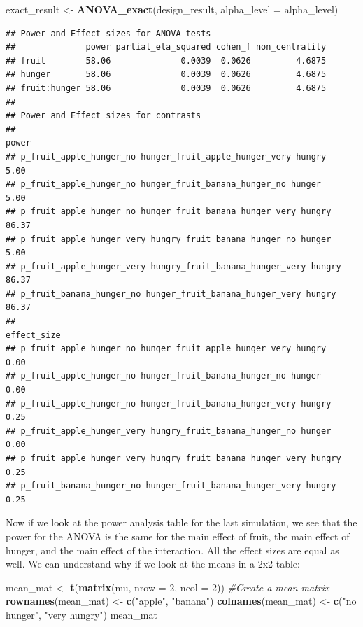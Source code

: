 \documentclass[]{book}
\newenvironment{Shaded}{\begin{snugshade}}{\end{snugshade}}
\newcommand{\CommentTok}[1]{\textcolor[rgb]{0.56,0.35,0.01}{\textit{#1}}}
\newcommand{\DataTypeTok}[1]{\textcolor[rgb]{0.13,0.29,0.53}{#1}}
\newcommand{\DecValTok}[1]{\textcolor[rgb]{0.00,0.00,0.81}{#1}}
\newcommand{\KeywordTok}[1]{\textcolor[rgb]{0.13,0.29,0.53}{\textbf{#1}}}
\newcommand{\NormalTok}[1]{#1}
\newcommand{\StringTok}[1]{\textcolor[rgb]{0.31,0.60,0.02}{#1}}
\begin{document}
\begin{Shaded}
\begin{Highlighting}[]
\NormalTok{exact_result <-}\StringTok{ }\KeywordTok{ANOVA_exact}\NormalTok{(design_result, }\DataTypeTok{alpha_level =}\NormalTok{ alpha_level)}
\end{Highlighting}
\end{Shaded}

\begin{verbatim}
## Power and Effect sizes for ANOVA tests
##              power partial_eta_squared cohen_f non_centrality
## fruit        58.06              0.0039  0.0626         4.6875
## hunger       58.06              0.0039  0.0626         4.6875
## fruit:hunger 58.06              0.0039  0.0626         4.6875
## 
## Power and Effect sizes for contrasts
##                                                                  power
## p_fruit_apple_hunger_no hunger_fruit_apple_hunger_very hungry     5.00
## p_fruit_apple_hunger_no hunger_fruit_banana_hunger_no hunger      5.00
## p_fruit_apple_hunger_no hunger_fruit_banana_hunger_very hungry   86.37
## p_fruit_apple_hunger_very hungry_fruit_banana_hunger_no hunger    5.00
## p_fruit_apple_hunger_very hungry_fruit_banana_hunger_very hungry 86.37
## p_fruit_banana_hunger_no hunger_fruit_banana_hunger_very hungry  86.37
##                                                                  effect_size
## p_fruit_apple_hunger_no hunger_fruit_apple_hunger_very hungry           0.00
## p_fruit_apple_hunger_no hunger_fruit_banana_hunger_no hunger            0.00
## p_fruit_apple_hunger_no hunger_fruit_banana_hunger_very hungry          0.25
## p_fruit_apple_hunger_very hungry_fruit_banana_hunger_no hunger          0.00
## p_fruit_apple_hunger_very hungry_fruit_banana_hunger_very hungry        0.25
## p_fruit_banana_hunger_no hunger_fruit_banana_hunger_very hungry         0.25
\end{verbatim}

Now if we look at the power analysis table for the last simulation, we see that the power for the ANOVA is the same for the main effect of fruit, the main effect of hunger, and the main effect of the interaction. All the effect sizes are equal as well. We can understand why if we look at the means in a 2x2 table:

\begin{Shaded}
\begin{Highlighting}[]
\NormalTok{mean_mat <-}\StringTok{ }\KeywordTok{t}\NormalTok{(}\KeywordTok{matrix}\NormalTok{(mu, }
                     \DataTypeTok{nrow =} \DecValTok{2}\NormalTok{,}
                     \DataTypeTok{ncol =} \DecValTok{2}\NormalTok{)) }\CommentTok{#Create a mean matrix}
\KeywordTok{rownames}\NormalTok{(mean_mat) <-}\StringTok{ }\KeywordTok{c}\NormalTok{(}\StringTok{"apple"}\NormalTok{, }\StringTok{"banana"}\NormalTok{)}
\KeywordTok{colnames}\NormalTok{(mean_mat) <-}\StringTok{ }\KeywordTok{c}\NormalTok{(}\StringTok{"no hunger"}\NormalTok{, }\StringTok{"very hungry"}\NormalTok{)}
\NormalTok{mean_mat}
\end{Highlighting}
\end{Shaded}
\end{document}
